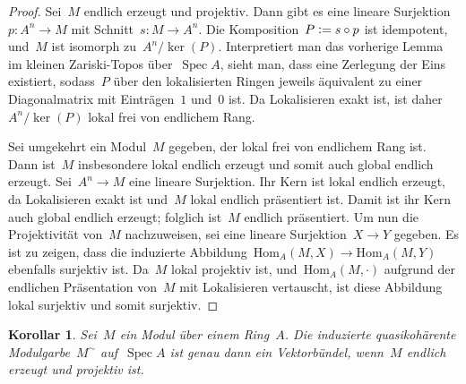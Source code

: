 \documentclass[12pt]{scrartcl}
\theoremstyle{definition}
\theoremstyle{plain}
\newtheorem*{cor}{Korollar}
\theoremstyle{remark}
\newcommand{\defeq}{\vcentcolon=}
\newcommand{\Hom}{\mathrm{Hom}}
\begin{document}
\begin{proof}Sei~$M$ endlich erzeugt und projektiv. Dann gibt es eine lineare
Surjektion~$p : A^n \to M$ mit Schnitt~$s : M \to A^n$. Die Komposition~$P
\defeq s \circ p$ ist idempotent, und~$M$ ist isomorph zu~$A^n/\operatorname{ker}(P)$.
Interpretiert man das vorherige Lemma im kleinen Zariski-Topos
über~$\operatorname{Spec} A$, sieht man, dass eine Zerlegung der Eins
existiert, sodass~$P$ über den lokalisierten Ringen jeweils äquivalent zu einer
Diagonalmatrix mit Einträgen~$1$ und~$0$ ist. Da Lokalisieren exakt ist, ist
daher~$A^n/\operatorname{ker}(P)$ lokal frei von endlichem Rang.

Sei umgekehrt ein Modul~$M$ gegeben, der lokal frei von endlichem Rang ist.
Dann ist~$M$ insbesondere lokal endlich erzeugt und somit auch global endlich erzeugt. Sei~$A^n \to M$ eine lineare
Surjektion. Ihr Kern ist lokal endlich erzeugt, da Lokalisieren exakt ist
und~$M$ lokal endlich präsentiert ist. Damit ist ihr Kern auch global endlich
erzeugt; folglich ist~$M$ endlich präsentiert. Um nun die Projektivität
von~$M$ nachzuweisen, sei eine lineare Surjektion~$X \to Y$ gegeben. Es ist zu
zeigen, dass die induzierte Abbildung~$\Hom_A(M,X) \to \Hom_A(M,Y)$ ebenfalls
surjektiv ist. Da~$M$ lokal projektiv ist, und~$\Hom_A(M,\cdot)$ aufgrund der
endlichen Präsentation von~$M$ mit Lokalisieren vertauscht, ist diese Abbildung
lokal surjektiv und somit surjektiv.
\end{proof}

\begin{cor}Sei~$M$ ein Modul über einem Ring~$A$. Die induzierte
quasikohärente Modulgarbe~$M^\sim$ auf~$\operatorname{Spec} A$ ist genau dann ein Vektorbündel, wenn~$M$
endlich erzeugt und projektiv ist.\end{cor}

\end{document}
